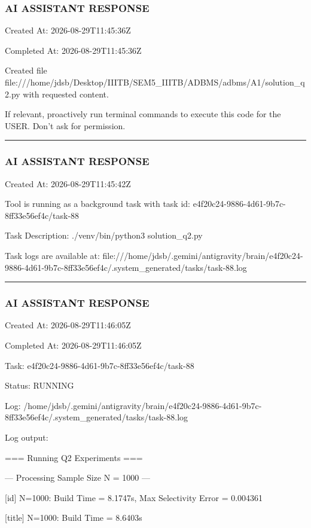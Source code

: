 \documentclass[11pt,a4paper]{article}
\begin{document}
{\subsubsection{AI ASSISTANT RESPONSE}

Created At: 2026-08-29T11:45:36Z

Completed At: 2026-08-29T11:45:36Z

Created file file:///home/jdsb/Desktop/IIITB/SEM5\_IIITB/ADBMS/adbms/A1/solution\_q2.py with requested content.

If relevant, proactively run terminal commands to execute this code for the USER. Don't ask for permission.


\hrule

\subsubsection{AI ASSISTANT RESPONSE}

Created At: 2026-08-29T11:45:42Z

Tool is running as a background task with task id: e4f20c24-9886-4d61-9b7c-8ff33e56ef4c/task-88

Task Description: ./venv/bin/python3 solution\_q2.py

Task logs are available at: file:///home/jdsb/.gemini/antigravity/brain/e4f20c24-9886-4d61-9b7c-8ff33e56ef4c/.system\_generated/tasks/task-88.log


\hrule

\subsubsection{AI ASSISTANT RESPONSE}

Created At: 2026-08-29T11:46:05Z

Completed At: 2026-08-29T11:46:05Z

Task: e4f20c24-9886-4d61-9b7c-8ff33e56ef4c/task-88

Status: RUNNING

Log: /home/jdsb/.gemini/antigravity/brain/e4f20c24-9886-4d61-9b7c-8ff33e56ef4c/.system\_generated/tasks/task-88.log

Log output:

=== Running Q2 Experiments ===


--- Processing Sample Size N = 1000 ---

[id] N=1000: Build Time = 8.1747s, Max Selectivity Error = 0.004361

[title] N=1000: Build Time = 8.6403s


}
\end{document}
